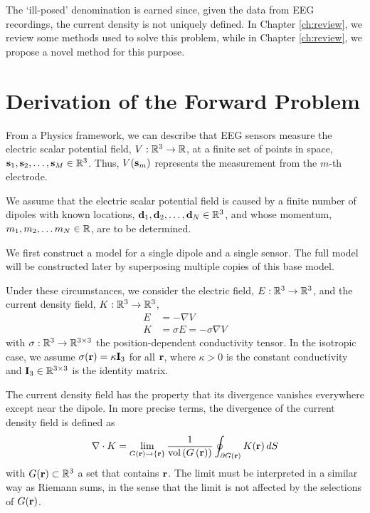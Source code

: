 The `ill-posed' denomination is earned since, given the data from EEG recordings, the current density is not uniquely defined.
%
In Chapter \ref{ch:review}, we review some methods used to solve this problem, while in Chapter \ref{ch:review}, we propose a novel method for this purpose.


\section{Derivation of the Forward Problem}
\label{sec:forward_derivation}

From a Physics framework, we can describe that EEG sensors measure the electric scalar potential field, $V: \mathbb{R}^3 \rightarrow \mathbb{R}$, at a finite set of points in space, $\mathbf{s}_{1}, \mathbf{s}_2, \dots, \mathbf{s}_M \in \mathbb{R}^3$. 
%
Thus, $V(\mathbf{s}_m)$ represents the measurement from the $m$-th electrode.

We assume that the electric scalar potential field is caused by a finite number of dipoles with known locations, ${\mathbf{d}_1, \mathbf{d}_2, \dots, \mathbf{d}_N \in \mathbb{R}^3}$, and whose momentum, $m_1, m_2, \dots m_N \in \mathbb{R}$, are to be determined.

We first construct a model for a single dipole and a single sensor. 
%
The full model will be constructed later by superposing multiple copies of this base model.

Under these circumstances, we consider the electric field, $E: \mathbb{R}^3 \rightarrow \mathbb{R}^3$, and the current density field, $K: \mathbb{R}^3 \rightarrow \mathbb{R}^3$,
\begin{align}
E &= - \nabla V
\\
K &= \sigma E = - \sigma \nabla V
\label{eq:model1}
\end{align}
with $\sigma: \mathbb{R}^3 \rightarrow \mathbb{R}^{3\times 3}$ the position-dependent conductivity tensor. 
%
In the isotropic case, we assume
$\sigma(\mathbf{r}) = \kappa \mathbf{I}_3$
for all $\mathbf{r}$, where $\kappa>0$ is the constant conductivity and $\mathbf{I}_3 \in \mathbb{R}^{3\times 3}$ is the identity matrix.

The current density field has the property that its divergence vanishes everywhere except near the dipole.
%
In more precise terms, the divergence of the current density field is defined as
\begin{equation}
\nabla \cdot K = \lim_{G(\mathbf{r}) \rightarrow \left\{ \mathbf{r} \right\}} \frac{1}{\text{vol}\left( G\left( \mathbf{r} \right) \right)}
\oint_{\partial G(\mathbf{r})} K(\mathbf{r})\, dS
\end{equation}
with $G(\mathbf{r})\subset \mathbb{R}^3$ a set that contains $\mathbf{r}$. 
%
The limit must be interpreted in a similar way as Riemann sums, in the sense that the limit is not affected by the selections of $G(\mathbf{r})$.

